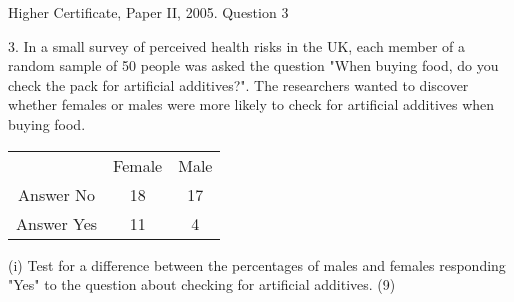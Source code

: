 \documentclass[a4paper,12pt]{article}
\begin{document}
Higher Certificate, Paper II, 2005. Question 3
\begin{framed}

3. In a small survey of perceived health risks in the UK, each member of a random sample of 50 people was asked the question "When buying food, do you check the pack for artificial additives?".  The researchers wanted to discover whether females or males were more likely to check for artificial additives when buying food. 

 \begin{center}
 \begin{tabular}{|c|c|c|}
 & Female & Male \\
  Answer No & 18 & 17\\ 
  Answer Yes & 11 &   4 \\
 \end{tabular}
 \end{center}

 
 
(i) Test for a difference between the percentages of males and females responding "Yes" to the question about checking for artificial additives. (9) 
 


 

\end{framed}
\end{document}
